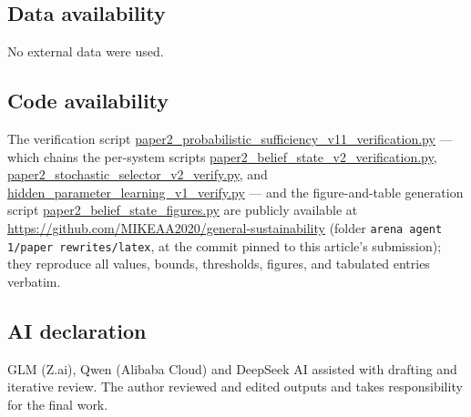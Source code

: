 \documentclass[10pt,twocolumn]{article}
\theoremstyle{plain}
\theoremstyle{definition}
\theoremstyle{remark}
\begin{document}
\subsection*{Data availability}
No external data were used.

\subsection*{Code availability}
The verification script
\url{paper2_probabilistic_sufficiency_v11_verification.py} --- which chains
the per-system scripts \url{paper2_belief_state_v2_verification.py},
\url{paper2_stochastic_selector_v2_verify.py}, and
\url{hidden_parameter_learning_v1_verify.py} --- and the figure-and-table
generation script \url{paper2_belief_state_figures.py} are publicly
available at \url{https://github.com/MIKEAA2020/general-sustainability}
(folder \texttt{arena agent 1/paper rewrites/latex}, at the commit
pinned to this article's submission); they reproduce all values, bounds,
thresholds, figures, and tabulated entries verbatim.

\subsection*{AI declaration}
GLM (Z.ai), Qwen (Alibaba Cloud) and DeepSeek AI assisted with drafting
and iterative review. The author reviewed and edited outputs and takes
responsibility for the final work.
\end{document}
